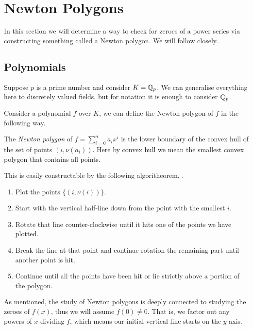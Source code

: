 \chapter{Newton Polygons}

In this section we will determine a way to check for zeroes of a power series via constructing
something called a Newton polygon. We will follow \cite[Section~7.4]{Gouvea} closely.

\section{Polynomials}

Suppose $p$ is a prime number and consider $K = \mathbb{Q}_p$. We can generalise everything here to
discretely valued fields, but for notation it is enough to consider $\mathbb{Q}_p$.

Consider a polynomial $f$ over $K$, we can define the Newton polygon of $f$ in the following way.

\begin{definition}
    The \emph{Newton polygon} of $f = \sum_{i=0}^n a_i x^i$ is the lower boundary of the convex hull
    of the set of points $(i,\nu(a_i))$.
    Here by convex hull we mean the smallest convex polygon that contains all points.
\end{definition}

This is easily constructable by the following algoritheorem, \cite[Pages~210-211]{Gouvea} .

\begin{enumerate}
    \item Plot the points $\{(i,\nu (i) )\}$.
    \item Start with the vertical half-line down from the point with the smallest $i$.
    \item Rotate that line counter-clockwise until it hits one of the points we have plotted.
    \item Break the line at that point and continue rotation the remaining part until another point
    is hit.
    \item Continue until all the points have been hit or lie strictly above a portion of the
    polygon.
\end{enumerate}

As mentioned, the study of Newton polygons is deeply connected to studying the zeroes of $f(x)$,
thus we will assume $f(0) \neq 0$. That is, we factor out any powers of $x$ dividing $f$, which
means our initial vertical line starts on the $y$-axis.

